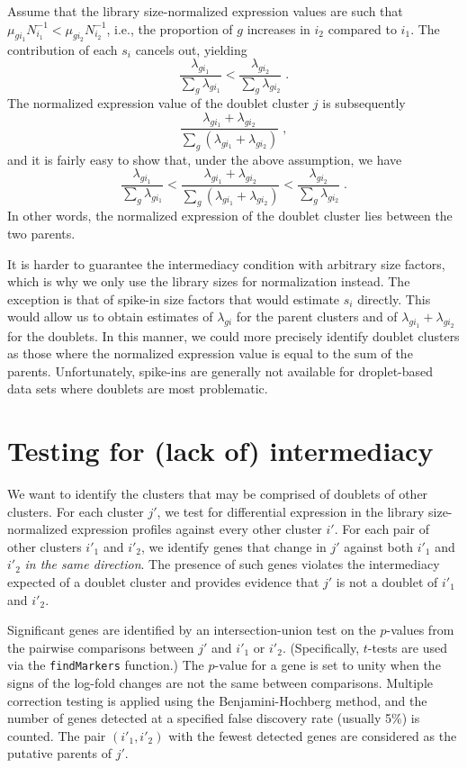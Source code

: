 \documentclass{article}
\begin{document}
Assume that the library size-normalized expression values are such that $\mu_{gi_1}N_{i_1}^{-1} < \mu_{gi_2}N_{i_2}^{-1}$, 
i.e., the proportion of $g$ increases in $i_2$ compared to $i_1$.
The contribution of each $s_i$ cancels out, yielding
\[
\frac{\lambda_{gi_1}}{\sum_g \lambda_{gi_1}} < \frac{\lambda_{gi_2}}{\sum_g \lambda_{gi_2}} \;.
\]
The normalized expression value of the doublet cluster $j$ is subsequently 
\[
\frac{\lambda_{gi_1} + \lambda_{gi_2}}{\sum_g (\lambda_{gi_1} + \lambda_{gi_2})} \;,
\]
and it is fairly easy to show that, under the above assumption, we have
\[
\frac{\lambda_{gi_1}}{\sum_g \lambda_{gi_1}} < 
\frac{\lambda_{gi_1} + \lambda_{gi_2}}{\sum_g (\lambda_{gi_1} + \lambda_{gi_2})}  < 
\frac{\lambda_{gi_2}}{\sum_g \lambda_{gi_2}} \;.
\]
In other words, the normalized expression of the doublet cluster lies between the two parents.

It is harder to guarantee the intermediacy condition with arbitrary size factors, which is why we only use the library sizes for normalization instead.
The exception is that of spike-in size factors that would estimate $s_i$ directly. 
This would allow us to obtain estimates of $\lambda_{gi}$ for the parent clusters and of $\lambda_{gi_1} + \lambda_{gi_2}$ for the doublets.
In this manner, we could more precisely identify doublet clusters as those where the normalized expression value is equal to the sum of the parents.
Unfortunately, spike-ins are generally not available for droplet-based data sets where doublets are most problematic.

\section{Testing for (lack of) intermediacy}
We want to identify the clusters that may be comprised of doublets of other clusters.
For each cluster $j'$, we test for differential expression in the library size-normalized expression profiles against every other cluster $i'$.
For each pair of other clusters $i'_1$ and $i'_2$, we identify genes that change in $j'$ against both $i'_1$ and $i'_2$ \textit{in the same direction}.
The presence of such genes violates the intermediacy expected of a doublet cluster and provides evidence that $j'$ is not a doublet of $i'_1$ and $i'_2$.

Significant genes are identified by an intersection-union test on the $p$-values from the pairwise comparisons between $j'$ and $i'_1$ or $i'_2$. 
(Specifically, $t$-tests are used via the \texttt{findMarkers} function.)
The $p$-value for a gene is set to unity when the signs of the log-fold changes are not the same between comparisons.
Multiple correction testing is applied using the Benjamini-Hochberg method, and the number of genes detected at a specified false discovery rate (usually 5\%) is counted.
The pair $(i'_1, i'_2)$ with the fewest detected genes are considered as the putative parents of $j'$.
\end{document}
